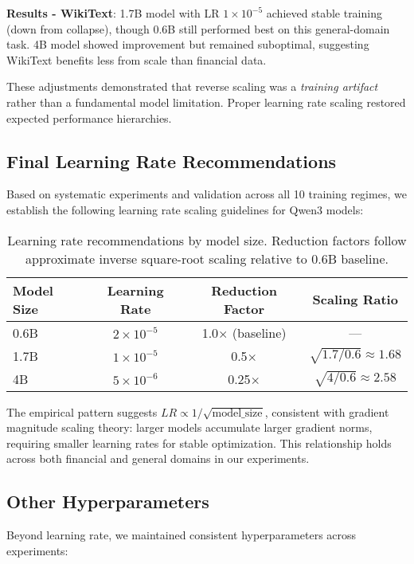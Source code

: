 \textbf{Results - WikiText}: 1.7B model with LR $1 \times 10^{-5}$ achieved stable training (down from collapse), though 0.6B still performed best on this general-domain task. 4B model showed improvement but remained suboptimal, suggesting WikiText benefits less from scale than financial data.

These adjustments demonstrated that reverse scaling was a \textit{training artifact} rather than a fundamental model limitation. Proper learning rate scaling restored expected performance hierarchies.

\subsection{Final Learning Rate Recommendations}

Based on systematic experiments and validation across all 10 training regimes, we establish the following learning rate scaling guidelines for Qwen3 models:

\begin{table}[h]
\centering
\begin{tabular}{lccc}
\toprule
\textbf{Model Size} & \textbf{Learning Rate} & \textbf{Reduction Factor} & \textbf{Scaling Ratio} \\
\midrule
0.6B & $2 \times 10^{-5}$ & 1.0$\times$ (baseline) & --- \\
1.7B & $1 \times 10^{-5}$ & 0.5$\times$ & $\sqrt{1.7/0.6} \approx 1.68$ \\
4B & $5 \times 10^{-6}$ & 0.25$\times$ & $\sqrt{4/0.6} \approx 2.58$ \\
\bottomrule
\end{tabular}
\caption[Learning Rate Recommendations by Model Size]{Learning rate recommendations by model size. Reduction factors follow approximate inverse square-root scaling relative to 0.6B baseline.}
\end{table}

The empirical pattern suggests $LR \propto 1/\sqrt{\text{model\_size}}$, consistent with gradient magnitude scaling theory: larger models accumulate larger gradient norms, requiring smaller learning rates for stable optimization. This relationship holds across both financial and general domains in our experiments.

\subsection{Other Hyperparameters}

Beyond learning rate, we maintained consistent hyperparameters across experiments:

